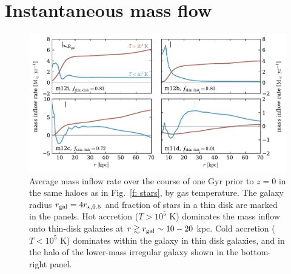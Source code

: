 \documentclass[fleqn,usenatbib]{mnras}
\newcommand{\fthin}{f_{\rm thin\,disk,\,recent}}
\newcommand{\tcools}{t_{10^5\,{\rm K}}}
\begin{document}

\section{Instantaneous mass flow}
\label{s: appendix-mass flow}

\begin{figure}
    \centering
    \includegraphics{figures/Mdot.pdf}
    \caption{
    Average mass inflow rate over the course of one Gyr prior to $z=0$ in the same haloes as in Fig.~\ref{f: stars}, by gas temperature.
    The galaxy radius $r_{\rm gal}=4 r_{\star,0.5}$ and fraction of stars in a thin disk are marked in the panels. 
    Hot accretion ($T>10^5$ K) dominates the mass inflow onto thin-disk galaxies at $r \gtrsim r_{\rm gal} \sim 10-20$ kpc.
    Cold accretion ($T<10^5$ K) dominates within the galaxy in thin disk galaxies, and in the halo of the lower-mass irregular galaxy shown in the bottom-right panel.
    }
    \label{f: Mdot}
\end{figure}
\end{document}
